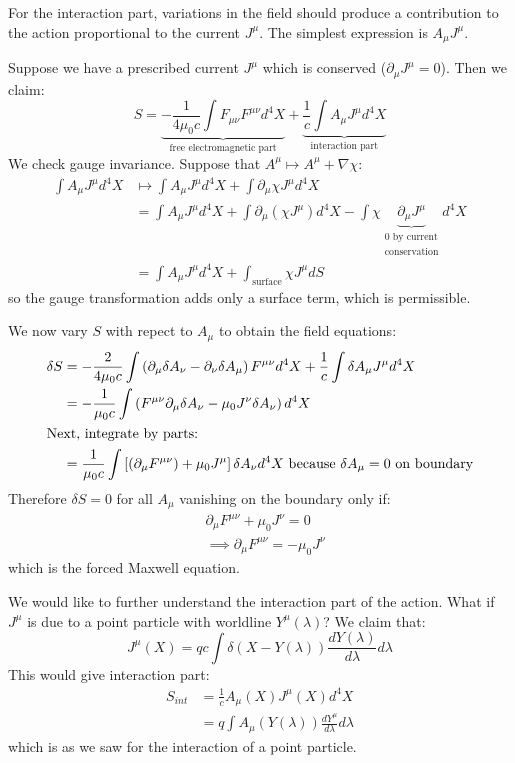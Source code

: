 \documentclass[../Main.tex]{subfiles}
\begin{document}
For the interaction part, variations in the field should produce a contribution to the action proportional to the current $J^\mu$. The simplest expression is $A_\mu J^\mu$.

Suppose we have a prescribed current $J^\mu$ which is conserved ($\partial_\mu J^\mu = 0$). Then we claim:
\begin{equation*}
    S = \underbrace{-\frac{1}{4\mu_0 c} \int F_{\mu\nu} F^{\mu\nu} d^4X}_{\text{free electromagnetic part}} + \underbrace{\frac1c \int A_\mu J^\mu d^4X}_{\text{interaction part}}
\end{equation*}
We check gauge invariance. Suppose that $A^\mu \mapsto A^\mu + \nabla \chi$:
\begin{align*}
    \int A_\mu J^\mu d^4X &\mapsto \int A_\mu J^\mu d^4X + \int \partial_\mu \chi J^\mu d^4X \\
    &= \int A_\mu J^\mu d^4X + \int \partial_\mu \left(\chi J^\mu\right) d^4X - \int \chi \underbrace{\partial_\mu J^\mu}_{\substack{0 \text{ by current}\\\text{conservation}}}d^4X \\
    &= \int A_\mu J^\mu d^4X + \int_{\text{surface}} \chi J^\mu dS
\end{align*}
so the gauge transformation adds only a surface term, which is permissible.

We now vary $S$ with repect to $A_\mu$ to obtain the field equations:
\begin{align*}
    \delta S &= -\frac{2}{4\mu_0 c} \int \left(\partial_\mu \delta A_\nu - \partial_\nu \delta A_\mu\right)F^{\mu \nu} d^4X + \frac1c \int \delta A_\mu J^\mu d^4X \\
    &= -\frac{1}{\mu_0 c} \int \left(F^{\mu \nu} \partial_\mu \delta A_\nu - \mu_0 J^\nu \delta A_\nu\right) d^4X \\
    \intertext{Next, integrate by parts:}
    &= \frac{1}{\mu_0 c} \int \left[ \left(\partial_\mu F^{\mu \nu}\right) + \mu_0 J^\mu\right] \delta A_\nu d^4X \text{ because } \delta A_\mu = 0 \text{ on boundary}
\end{align*}
Therefore $\delta S = 0$ for all $A_\mu$ vanishing on the boundary only if:
\begin{align*}
    &\partial_\mu F^{\mu \nu} + \mu_0 J^\nu = 0 \\
    &\implies \partial_\mu F^{\mu \nu} = - \mu_0 J^\nu
\end{align*}
which is the forced Maxwell equation.

We would like to further understand the interaction part of the action. What if $J^\mu$ is due to a point particle with worldline $Y^\mu(\lambda)$? We claim that:
\begin{equation}
    J^\mu(X) = qc \int \delta(X - Y(\lambda)) \frac{dY(\lambda)}{d\lambda} d\lambda
    \label{eqnParticleCurrent}
\end{equation}
This would give interaction part:
\begin{align*}
    S_{int} &= \frac1c A_\mu(X) J^\mu(X) d^4X \\
    &= q \int A_\mu(Y(\lambda)) \frac{dY^\mu}{d\lambda} d\lambda
\end{align*}
which is as we saw for the interaction of a point particle.
\end{document}
